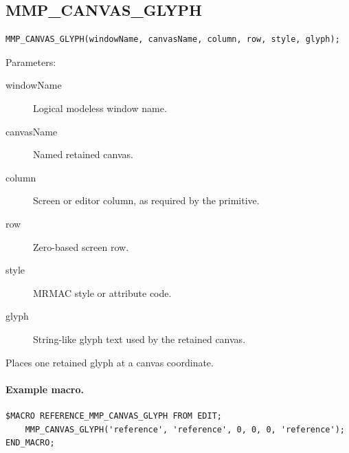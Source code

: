 \documentclass[a4paper,10pt,twoside,openany]{book}
\newenvironment{mrmacextension}{\begin{changebar}}{\end{changebar}}
\begin{document}
\begin{mrmacextension}
\label{prim:procedure-mmp-canvas-glyph}
\subsection*{MMP\_CANVAS\_GLYPH}
\begin{verbatim}
MMP_CANVAS_GLYPH(windowName, canvasName, column, row, style, glyph);
\end{verbatim}
Parameters:
\begin{description}
\item[windowName] Logical modeless window name.
\item[canvasName] Named retained canvas.
\item[column] Screen or editor column, as required by the primitive.
\item[row] Zero-based screen row.
\item[style] MRMAC style or attribute code.
\item[glyph] String-like glyph text used by the retained canvas.
\end{description}

Places one retained glyph at a canvas coordinate.

\paragraph{Example macro.}
\begin{verbatim}
$MACRO REFERENCE_MMP_CANVAS_GLYPH FROM EDIT;
    MMP_CANVAS_GLYPH('reference', 'reference', 0, 0, 0, 'reference');
END_MACRO;
\end{verbatim}
\end{mrmacextension}
\end{document}
